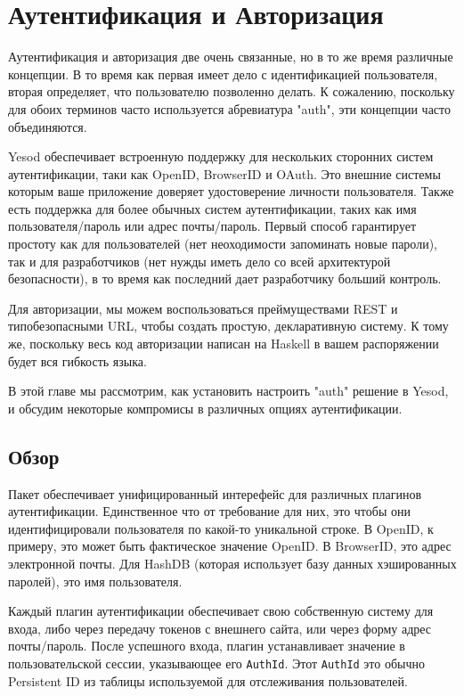 \chapter{Аутентификация и Авторизация}\label{chap:auth}

Аутентификация и авторизация две очень связанные, но в то же время различные концепции. В то время как первая имеет дело с идентификацией пользователя, вторая определяет, что пользователю позволенно делать. К сожалению, поскольку для обоих терминов часто используется абревиатура "auth", эти концепции часто объединяются.

Yesod обеспечивает встроенную поддержку для нескольких сторонних систем аутентификации, таки как OpenID, BrowserID и OAuth. Это внешние системы которым ваше приложение доверяет удостоверение личности пользователя. Также есть поддержка для более обычных систем аутентификации, таких как имя пользователя/пароль или адрес почты/пароль. Первый способ гарантирует простоту как для пользователей (нет неоходимости запоминать новые пароли), так и для разработчиков (нет нужды иметь дело со всей архитектурой безопасности), в то время как последний дает разработчику больший контроль.

Для авторизации, мы можем воспользоваться преймуществами REST и типобезопасными URL, чтобы создать простую, декларативную систему. К тому же, поскольку весь код авторизации написан на Haskell в вашем распоряжении будет вся гибкость языка.

В этой главе мы рассмотрим, как установить настроить "auth" решение в Yesod, и обсудим некоторые компромисы в различных опциях аутентификации.

\section{Обзор}

Пакет  обеспечивает унифицированный интерефейс для различных плагинов аутентификации. Единственное что от требование для них, это чтобы они идентифицировали пользователя по какой-то уникальной строке. В OpenID, к примеру, это может быть фактическое значение OpenID. В BrowserID, это адрес электронной почты. Для HashDB (которая использует базу данных хэшированных паролей), это имя пользователя.

Каждый плагин аутентификации обеспечивает свою собственную систему для входа, либо через передачу токенов с внешнего сайта, или через форму адрес почты/пароль. После успешного входа, плагин устанавливает значение в пользовательской сессии, указывающее его \lstinline'AuthId'. Этот \lstinline'AuthId' это обычно Persistent ID из таблицы используемой для отслеживания пользователей. 

